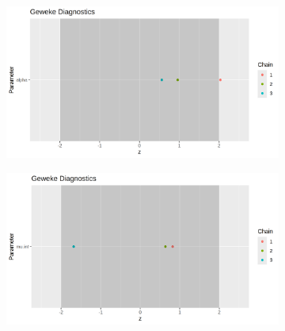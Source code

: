 \documentclass[12pt]{article}
\begin{document}
\begin{figure}[h!]
    \centering
    \begin{subfigure}{0.45\textwidth}
        \includegraphics[width=\linewidth]{pictures/centered/centgewkalpha.png}
    \end{subfigure}
    \begin{subfigure}{0.45\textwidth}
        \includegraphics[width=\linewidth]{pictures/mod2/mod2geweke_muint.png}
    \end{subfigure}


\end{figure}
\end{document}
